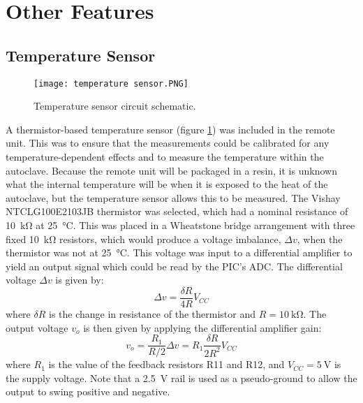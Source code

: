 \section{Other Features}

\subsection{Temperature Sensor}
\begin{figure}[htb]
	\centering
	\texttt{[image: temperature sensor.PNG]}
	\caption{Temperature sensor circuit schematic.}
	\label{fig: temperature sensor}
\end{figure}

A thermistor-based temperature sensor (figure \ref{fig: temperature sensor}) was included in the remote unit. This was to ensure that the measurements could be calibrated for any temperature-dependent effects and to measure the temperature within the autoclave. Because the remote unit will be packaged in a resin, it is unknown what the internal temperature will be when it is exposed to the heat of the autoclave, but the temperature sensor allows this to be measured. The Vishay NTCLG100E2103JB \cite{thermistor} thermistor was selected, which had a nominal resistance of \SI{10}{\kilo\ohm} at \SI{25}{\celsius}. This was placed in a Wheatstone bridge arrangement with three fixed \SI{10}{\kilo\ohm} resistors, which would produce a voltage imbalance, $\Delta v$, when the thermistor was not at \SI{25}{\celsius}. This voltage was input to a differential amplifier to yield an output signal which could be read by the PIC's ADC. The differential voltage $\Delta v$ is given by:
\begin{equation}
\Delta v = \frac{\delta R}{4 R}V_{CC}
\end{equation}
where $\delta R$ is the change in resistance of the thermistor and $R=\SI{10}{\kilo\ohm}$. The output voltage $v_o$ is then given by applying the differential amplifier gain:
\begin{equation}
v_o = \frac{R_1}{R / 2} \Delta v =R_1 \frac{\delta R}{2 R^2}V_{CC}
\end{equation}
where $R_1$ is the value of the feedback resistors R11 and R12, and $V_{CC} =\SI{5}{\volt}$ is the supply voltage. Note that a \SI{2.5}{\volt} rail is used as a pseudo-ground to allow the output to swing positive and negative.\\

